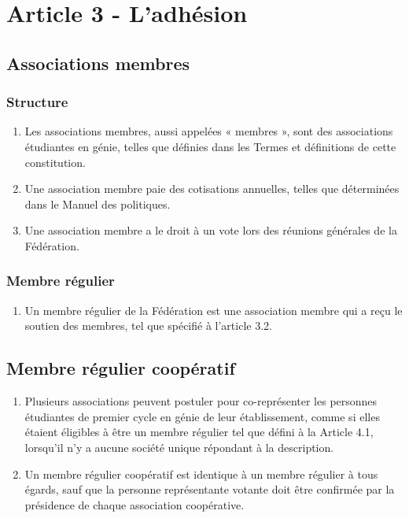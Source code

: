 \section{Article 3 - L'adhésion}
\label{article-3-l-adhesion}

\subsection{Associations membres}
\label{associations-membres}

\subsubsection{Structure}
\begin{enumerate}
 \item
  Les associations membres, aussi appelées « membres », sont des associations étudiantes en génie, telles que définies dans les Termes et définitions de cette constitution.
 \item
  Une association membre paie des cotisations annuelles, telles que déterminées dans le Manuel des politiques.
 \item
  Une association membre a le droit à un vote lors des réunions générales de la Fédération.
\end{enumerate}

\subsubsection{Membre régulier}
\begin{enumerate}
 \item Un membre régulier de la Fédération est une association membre qui a reçu le soutien des membres, tel que spécifié à l'article 3.2.
\end{enumerate}

\subsection{Membre régulier coopératif}
\label{membre-regulier-cooperatif}

\begin{enumerate}
 \item
  Plusieurs associations peuvent postuler pour co-représenter les personnes étudiantes de premier cycle en génie de leur établissement, comme si elles étaient éligibles à être un membre régulier tel que défini à la Article 4.1, lorsqu'il n'y a aucune société unique répondant à la description.
 \item
  Un membre régulier coopératif est identique à un membre régulier à tous égards, sauf que la personne représentante votante doit être confirmée par la présidence de chaque association coopérative.
\end{enumerate}

